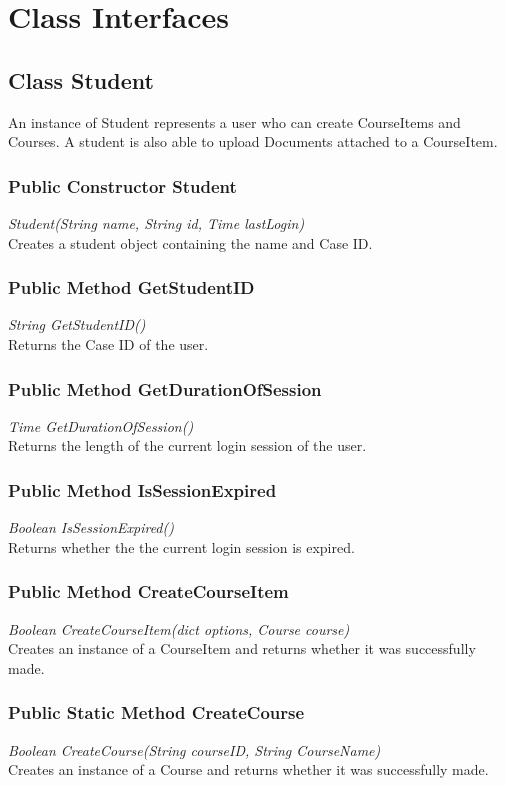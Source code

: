 \documentclass[16pt]{scrreprt}
\begin{document}
\chapter{Class Interfaces}

\section{Class Student}
An instance of Student represents a user who can create CourseItems and Courses. A student is also able to upload Documents attached to a CourseItem.

\subsection{Public Constructor Student}
\textit{Student(String name, String id, Time lastLogin)} \\
Creates a student object containing the name and Case ID.

\subsection{Public Method GetStudentID}
\textit{String GetStudentID()} \\
Returns the Case ID of the user.

\subsection{Public Method GetDurationOfSession}
\textit{Time GetDurationOfSession()} \\
Returns the length of the current login session of the user.

\subsection{Public Method IsSessionExpired}
\textit{Boolean IsSessionExpired()} \\
Returns whether the the current login session is expired.

\subsection{Public Method CreateCourseItem}
\textit{Boolean CreateCourseItem(dict options, Course course)} \\
Creates an instance of a CourseItem and returns whether it was successfully made.

\subsection{Public Static Method CreateCourse}
\textit{Boolean CreateCourse(String courseID, String CourseName)} \\
Creates an instance of a Course and returns whether it was	 successfully made.
\end{document}
